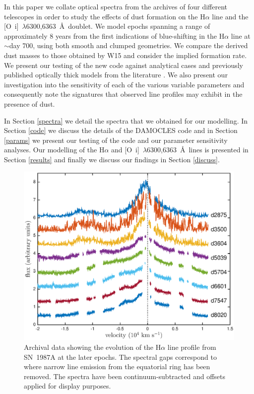 \documentclass[useAMS,usenatbib,usegraphicx]{mnras}
\begin{document}
In this paper we collate optical spectra from the archives of four 
different telescopes in order to study the effects of dust formation on 
the H$\alpha$ line and the [O~{\sc i}]~$\lambda$6300,6363~\AA\ doublet.  
We model epochs spanning a range of approximately 8 years 
from the first indications of blue-shifting in the H$\alpha$ line at 
$\sim$day 700, using both smooth and clumped geometries.  We compare the 
derived dust masses to those obtained by W15 and consider the implied 
formation rate.  We present our testing of the new code against 
analytical cases and previously published optically thick models from 
the literature \citep{Lucy1989}. We also present our investigation into 
the sensitivity of each of the various variable parameters and 
consequently note the signatures that observed line profiles may exhibit 
in the presence of dust.

In Section \ref{spectra} we detail the spectra that we obtained for our 
modelling.  In Section \ref{code} we discuss the details of the DAMOCLES 
code and in Section \ref{params} we present our testing of the code and our parameter sensitivity 
analyses.  Our modelling of the H$\alpha$ and 
[O~{\sc i}]~$\lambda$6300,6363~\AA\ lines is presented in Section 
\ref{results} and finally we discuss our findings in Section \ref{discuss}.



\begin{figure}
\includegraphics[trim =45 10 45 15,clip=true,scale=0.51]{Ha_evol_late_1col}
\caption{Archival data showing the evolution of the H$\alpha$
line profile from SN~1987A at the later epochs. The spectral gaps 
correspond to where narrow line emission from the equatorial ring has been 
removed. The spectra have been continuum-subtracted and offsets applied 
for display purposes.}
\label{Ha_evol_late}
\end{figure}
\end{document}
